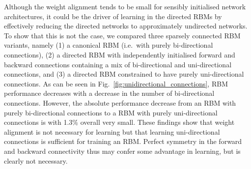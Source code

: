 \documentclass[11pt]{article}
\begin{document}
Although the weight alignment tends to be small for sensibly
initialised network architectures, it could be the driver of learning
in the directed RBMs by effectively reducing the directed networks to
approximately undirected networks. To show that this is not the case,
we compared three sparsely connected RBM variants, namely (1) a
canonical RBM (i.e.\ with purely bi-directional connections), (2) a
directed RBM with independently initialised forward and backward
connections containing a mix of bi-directional and uni-directional
connections, and (3) a directed RBM constrained to have purely
uni-directional connections.
As can be seen in Fig.~\ref{fig:unidirectional_connections}, RBM
performance decreases with a decrease in the number of bi-directional
connections. However, the absolute performance decrease from an RBM
with purely bi-directional connections to a RBM with purely
uni-directional connections is with 1.3\% overall very small.
These findings show that weight alignment is not necessary
for learning but that learning uni-directional connections is
sufficient for training an RBM. Perfect symmetry in the forward and
backward connectivity thus may confer some advantage in learning, but
is clearly not necessary.
\end{document}

